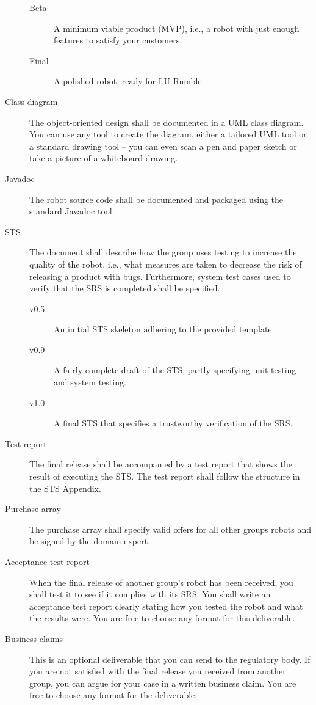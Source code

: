 \documentclass{scrreprt}
\begin{document}
\begin{description}
\begin{description}
\item[Beta] A minimum viable product (MVP), i.e., a robot with just enough features to satisfy your customers.
\item[Final] A polished robot, ready for LU Rumble.
\end{description}
\item[Class diagram] The object-oriented design shall be documented in a UML class diagram. You can use any tool to create the diagram, either a tailored UML tool or a standard drawing tool -- you can even scan a pen and paper sketch or take a picture of a whiteboard drawing.
\item[Javadoc] The robot source code shall be documented and packaged using the standard Javadoc tool.
\item[STS] The document shall describe how the group uses testing to increase the quality of the robot, i.e., what measures are taken to decrease the risk of releasing a product with bugs. Furthermore, system test cases used to verify that the SRS is completed shall be specified.
\begin{description}
\item[v0.5] An initial STS skeleton adhering to the provided template.
\item[v0.9] A fairly complete draft of the STS, partly specifying unit testing and system testing.
\item[v1.0] A final STS that specifies a trustworthy verification of the SRS.
\end{description}
\item[Test report] The final release shall be accompanied by a test report that shows the result of executing the STS. The test report shall follow the structure in the STS Appendix.
\item[Purchase array] The purchase array shall specify valid offers for all other groups robots and be signed by the domain expert.
\item[Acceptance test report] When the final release of another group's robot has been received, you shall test it to see if it complies with its SRS. You shall write an acceptance test report clearly stating how you tested the robot and what the results were. You are free to choose any format for this deliverable.
\item[Business claims] This is an optional deliverable that you can send to the regulatory body. If you are not satisfied with the final release you received from another group, you can argue for your case in a written business claim. You are free to choose any format for the deliverable. 
\end{description}
\end{document}
